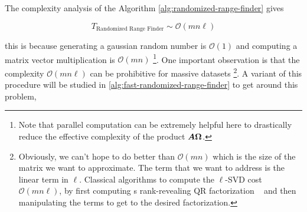 \begin{figure}[ht]
\begin{center}
\end{center}
\end{figure}

The complexity analysis of the Algorithm \ref{alg:randomized-range-finder}
gives

\begin{equation}\label{eq:analysis-rand-finder}
T_{\text{Randomized Range Finder}}\sim \mathcal{O}(mn\ell)
\end{equation}

this is because generating a gaussian random number is $\mathcal{O}(1)$
and computing a matrix vector multiplication is $\mathcal{O}(mn)$
\footnote{Note that parallel computation can be extremely helpful here
to drastically reduce the effective complexity of the product $\bm{A}\bm{\Omega}$.}. 
One important observation is that the complexity $\mathcal{O}(mn\ell)$
can be prohibitive for massive datasets \footnote{Obviously, we can't hope
to do better than $\mathcal{O}(mn)$ which is the size of the matrix
we want to approximate. The term that we want to address is the linear term
in $\ell$. Classical algorithms to compute the $\ell$-SVD cost 
$\mathcal{O}(mn\ell)$, by first computing s rank-revealing QR factorization
~\cite{gu1996efficient} and then manipulating the terms to get to the desired
factorization.}. A variant of this procedure
will be studied in \ref{alg:fast-randomized-range-finder}
to get around this problem,

